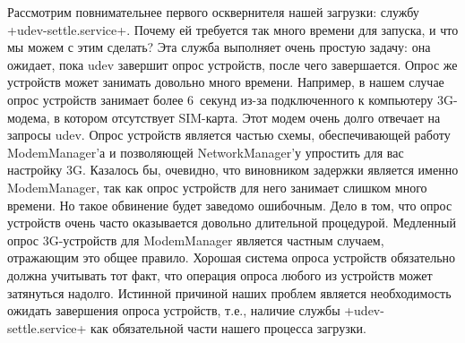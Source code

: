 \documentclass[10pt,oneside,a4paper]{article}
\begin{document}
Рассмотрим повнимательнее первого осквернителя нашей загрузки: службу
+udev-settle.service+. Почему ей требуется так много времени для запуска, и что
мы можем с этим сделать? Эта служба выполняет очень простую задачу: она ожидает,
пока udev завершит опрос устройств, после чего завершается. Опрос же устройств
может занимать довольно много времени. Например, в нашем случае опрос устройств
занимает более 6~секунд из-за подключенного к компьютеру 3G-модема, в котором
отсутствует SIM-карта. Этот модем очень долго отвечает на запросы udev. Опрос
устройств является частью схемы, обеспечивающей работу ModemManager'а и
позволяющей NetworkManager'у упростить для вас настройку 3G. Казалось бы,
очевидно, что виновником задержки является именно ModemManager, так как опрос
устройств для него занимает слишком много времени. Но такое обвинение будет
заведомо ошибочным. Дело в том, что опрос устройств очень часто оказывается довольно
длительной процедурой. Медленный опрос 3G-устройств для ModemManager является
частным случаем, отражающим это общее правило. Хорошая система опроса устройств
обязательно должна учитывать тот факт, что операция опроса любого из устройств
может затянуться надолго. Истинной причиной наших проблем является необходимость
ожидать завершения опроса устройств, т.е., наличие службы
+udev-settle.service+ как обязательной части нашего процесса загрузки.
\end{document}
